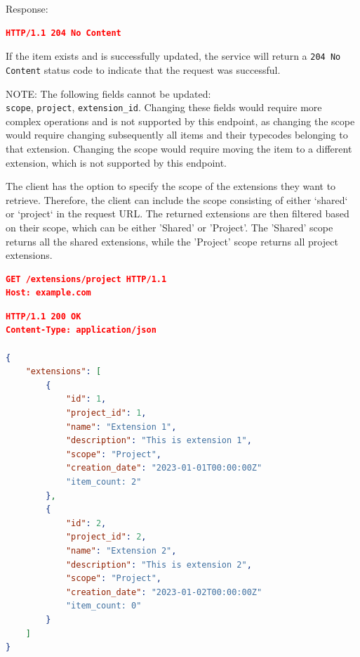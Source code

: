 Response:

\begin{lstlisting}[language=json,label={lst:lstlisting30}]
HTTP/1.1 204 No Content
\end{lstlisting}

If the item exists and is successfully updated, the service will return a \texttt{204 No Content} status code to indicate that the request was successful.

\begin{mynote}
    NOTE: The following fields cannot be updated: \\ \texttt{scope}, \texttt{project}, \texttt{extension\_id}.
    Changing these fields would require more complex operations and is not supported by this endpoint, as changing the scope would require changing subsequently all items and their typecodes belonging to that extension.
    Changing the scope would require moving the item to a different extension, which is not supported by this endpoint.
\end{mynote}

The client has the option to specify the scope of the extensions they want to retrieve.
Therefore, the client can include the scope consisting of either `shared` or `project` in the request URL\@.
The returned extensions are then filtered based on their scope, which can be either 'Shared' or 'Project'.
The 'Shared' scope returns all the shared extensions, while the 'Project' scope returns all project extensions.

\begin{lstlisting}[language=json,label={lst:lstlisting22}]
GET /extensions/project HTTP/1.1
Host: example.com
\end{lstlisting}

\begin{lstlisting}[language=json,label={lst:lstlisting14}]
HTTP/1.1 200 OK
Content-Type: application/json

{
    "extensions": [
        {
            "id": 1,
            "project_id": 1,
            "name": "Extension 1",
            "description": "This is extension 1",
            "scope": "Project",
            "creation_date": "2023-01-01T00:00:00Z"
            "item_count: 2"
        },
        {
            "id": 2,
            "project_id": 2,
            "name": "Extension 2",
            "description": "This is extension 2",
            "scope": "Project",
            "creation_date": "2023-01-02T00:00:00Z"
            "item_count: 0"
        }
    ]
}
\end{lstlisting}



